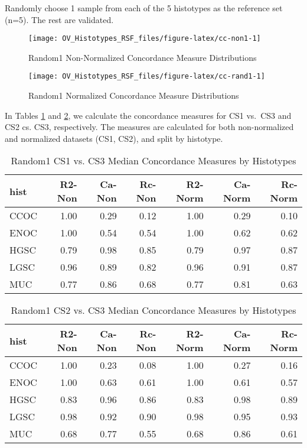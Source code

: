 \documentclass[
]{report}
\begin{document}
Randomly choose 1 sample from each of the 5 histotypes as the reference set (n=5). The rest are validated.

\begin{figure}[H]

{\centering \texttt{[image: OV\_Histotypes\_RSF\_files/figure-latex/cc-non1-1]} 

}

\caption{Random1 Non-Normalized Concordance Measure Distributions}\label{fig:cc-non1}
\end{figure}

\begin{figure}[H]

{\centering \texttt{[image: OV\_Histotypes\_RSF\_files/figure-latex/cc-rand1-1]} 

}

\caption{Random1 Normalized Concordance Measure Distributions}\label{fig:cc-rand1}
\end{figure}

In Tables \ref{tab:rand1-cs1-vs-cs3} and \ref{tab:rand1-cs2-vs-cs3}, we calculate the concordance measures for CS1 vs.~CS3 and CS2 cs. CS3, respectively. The measures are calculated for both non-normalized and normalized datasets (CS1, CS2), and split by histotype.

\begin{table}

\caption{\label{tab:rand1-cs1-vs-cs3}Random1 CS1 vs. CS3 Median Concordance Measures by Histotypes}
\centering
\begin{tabular}[t]{l|r|r|r|r|r|r}
\hline
hist & R2-Non & Ca-Non & Rc-Non & R2-Norm & Ca-Norm & Rc-Norm\\
\hline
CCOC & 1.00 & 0.29 & 0.12 & 1.00 & 0.29 & 0.10\\
\hline
ENOC & 1.00 & 0.54 & 0.54 & 1.00 & 0.62 & 0.62\\
\hline
HGSC & 0.79 & 0.98 & 0.85 & 0.79 & 0.97 & 0.87\\
\hline
LGSC & 0.96 & 0.89 & 0.82 & 0.96 & 0.91 & 0.87\\
\hline
MUC & 0.77 & 0.86 & 0.68 & 0.77 & 0.81 & 0.63\\
\hline
\end{tabular}
\end{table}

\begin{table}

\caption{\label{tab:rand1-cs2-vs-cs3}Random1 CS2 vs. CS3 Median Concordance Measures by Histotypes}
\centering
\begin{tabular}[t]{l|r|r|r|r|r|r}
\hline
hist & R2-Non & Ca-Non & Rc-Non & R2-Norm & Ca-Norm & Rc-Norm\\
\hline
CCOC & 1.00 & 0.23 & 0.08 & 1.00 & 0.27 & 0.16\\
\hline
ENOC & 1.00 & 0.63 & 0.61 & 1.00 & 0.61 & 0.57\\
\hline
HGSC & 0.83 & 0.96 & 0.86 & 0.83 & 0.98 & 0.89\\
\hline
LGSC & 0.98 & 0.92 & 0.90 & 0.98 & 0.95 & 0.93\\
\hline
MUC & 0.68 & 0.77 & 0.55 & 0.68 & 0.86 & 0.61\\
\hline
\end{tabular}
\end{table}
\end{document}
